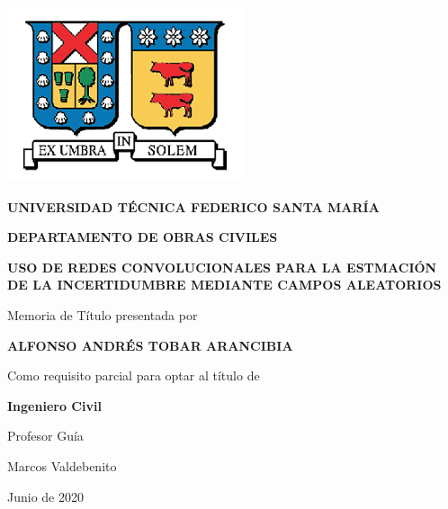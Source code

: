 \documentclass[10pt,twoside,letterpaper]{phstylee}
\begin{document}
\begin{center}

\begin{center}
  \includegraphics{images/logo_new.png}
\end{center}


\large \textbf{UNIVERSIDAD TÉCNICA FEDERICO SANTA MARÍA}

\large \textbf{DEPARTAMENTO DE OBRAS CIVILES}

\vspace{20mm}

\Large {\bf USO DE REDES CONVOLUCIONALES PARA LA ESTMACIÓN DE LA INCERTIDUMBRE MEDIANTE CAMPOS ALEATORIOS}

\vspace{15mm}

\normalsize Memoria de Título presentada por

\large \textbf{ALFONSO ANDRÉS TOBAR ARANCIBIA}

\vspace{15mm}

\normalsize Como requisito parcial para optar al título de

\textbf{Ingeniero Civil}

\vspace{2.5mm}



\vspace{15mm}

Profesor Guía

Marcos Valdebenito %

\vspace{5mm}
Junio de 2020


\end{center}


\vspace{5mm}
\end{document}
